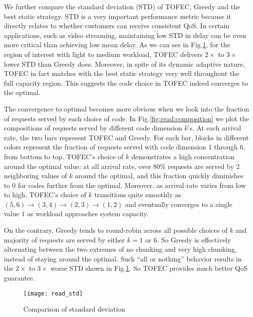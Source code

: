 \documentclass[journal]{IEEEtran}
\newcommand{\ourproposal}{TOFEC\xspace}
\newcommand{\onewidth}{0.74\columnwidth}
\begin{document}
We further compare the standard deviation (STD) of \ourproposal, Greedy and the best static strategy. STD is a very important performance metric because it directly relates to whether customers can receive consistent QoS. In certain applications, such as video streaming, maintaining low STD in delay can be even more critical than achieving low mean delay. As we can see in Fig.\ref{fig:read:std}, for the region of interest with light to medium workload, \ourproposal delivers $2\times$ to $3\times$ lower STD than Greedy does. Moreover, in spite of its dynamic adaptive nature, \ourproposal in fact matches with the best static strategy very well throughout the full capacity region. This suggests the code choice in \ourproposal indeed converges to the optimal.

The convergence to optimal becomes more obvious when we look into the fraction of requests served by each choice of code. In Fig.\ref{fig:read:composition} we plot the compositions of requests served by different code dimension $k$'s. 
At each arrival rate, the two bars represent \ourproposal and Greedy. For each bar, blocks in different colors represent the fraction of requests served with code dimension
1 through 6, from bottom to top. \ourproposal's choice of $k$ demonstrates a high concentration around the optimal value: at all arrival rate, over 80\%  requests are served by 2 neighboring values of $k$ around the optimal, and this fraction quickly diminishes to 0 for codes further from the optimal. Moreover, as arrival rate varies from low to high, \ourproposal's choice of $k$ transitions quite smoothly as $(5,6) \rightarrow (3,4) \rightarrow  (2,3) \rightarrow (1,2)$ and eventually converges to a single value $1$ as workload approaches system capacity.

On the contrary, Greedy tends to round-robin across all possible choices of $k$ and majority of requests are served by either $k=1$ or $6$. So Greedy is effectively alternating between the two extremes of no chunking and very high chunking,  instead of staying around the optimal. 
Such ``all or nothing'' behavior results in the $2\times$ to $3\times$ worse STD shown in Fig.\ref{fig:read:std}. So \ourproposal provides much better QoS guarantee.









\begin{figure}[t]
\centering
\texttt{[image: read\_std]}
\caption{Comparison of standard deviation}
\label{fig:read:std}
\end{figure}
\end{document}
